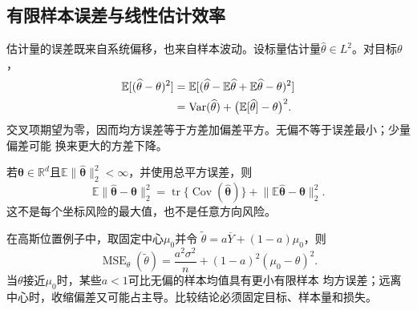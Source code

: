 \subsection{有限样本误差与线性估计效率}
\label{sec:statistics-bias-efficiency}
估计量的误差既来自系统偏移，也来自样本波动。设标量估计量\(\widehat\theta\in L^2\)。对目标\(\theta\)，
\begin{align}
  \mathbb{E}[(\widehat\theta-\theta)^2]
  &=
  \mathbb{E}[(\widehat\theta-\mathbb{E}\widehat\theta
  +\mathbb{E}\widehat\theta-\theta)^2] \notag\\
  &=
  \operatorname{Var}(\widehat\theta)
  +\bigl(\mathbb{E}[\widehat\theta]-\theta\bigr)^2.
  \label{eq:statistics-mse-decomposition}
\end{align}
交叉项期望为零，因而均方误差等于方差加偏差平方。无偏不等于误差最小；少量偏差可能
换来更大的方差下降。

若\(\bm\theta\in\mathbb{R}^d\)且\(\mathbb E\lVert\widehat{\bm\theta}\rVert_2^2<\infty\)，并使用总平方误差，则
\[
  \mathbb{E}\lVert\widehat{\bm\theta}-\bm\theta\rVert_2^2
  =\operatorname{tr}\{\operatorname{Cov}(\widehat{\bm\theta})\}
   +\lVert\mathbb{E}\widehat{\bm\theta}-\bm\theta\rVert_2^2.
\]
这不是每个坐标风险的最大值，也不是任意方向风险。

在高斯位置例子中，取固定中心\(\mu_0\)并令
\(\widetilde\theta=a\overline Y+(1-a)\mu_0\)，则
\[
  \operatorname{MSE}_\theta(\widetilde\theta)
  =\frac{a^2\sigma^2}{n}+(1-a)^2(\mu_0-\theta)^2.
\]
当\(\theta\)接近\(\mu_0\)时，某些\(a<1\)可比无偏的样本均值具有更小有限样本
均方误差；远离中心时，收缩偏差又可能占主导。比较结论必须固定目标、样本量和损失。

